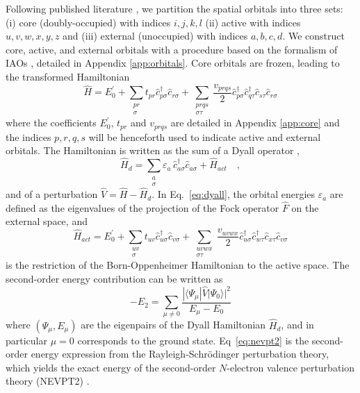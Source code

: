 \documentclass[aps,pra,twocolumn]{revtex4-2}
\newcommand{\crt}[1]{\hat{c}_{#1}^\dagger}
\newcommand{\dst}[1]{\hat{c}_{#1}^{\phantom{\dagger}}}
\begin{document}
Following published literature \cite{sokolov2016time,sokolov2017time}, we partition the spatial orbitals into three sets:
(i) core (doubly-occupied) with indices $i,j,k,l$ 
(ii) active with indices $u,v,w,x,y,z$ and 
(iii) external (unoccupied) with indices $a,b,c,d$. 
We construct core, active, and external orbitals with a procedure based on the formalism of IAOs \cite{knizia2013intrinsic}, detailed in Appendix \ref{app:orbitals}.
Core orbitals are frozen, leading to the transformed Hamiltonian
\begin{equation}
\label{eq:core_frozen}
\hat{H} = E_0^\prime + \sum_{\substack{pr \\ \sigma}} t_{pr} \crt{p\sigma} \dst{r\sigma} + \sum_{\substack{prqs \\ \sigma\tau}} \frac{v_{prqs}}{2} \crt{p\sigma} \crt{q\tau} \dst{s\tau}  \dst{r\sigma}
\end{equation}
where the coefficients $E_0^\prime$, $t_{pr}$ and $v_{prqs}$ are detailed in Appendix \ref{app:core} and the indices $p,r,q,s$ will be henceforth used to indicate
active and external orbitals. The Hamiltonian is written as the sum of a Dyall operator \cite{dyall1995choice},
\begin{equation}
\label{eq:dyall}
\hat{H}_d = \sum_{\substack{a \\ \sigma}} \varepsilon_a \, \crt{a\sigma} \dst{a\sigma} + \hat{H}_{act} \quad,
\end{equation}
and of a perturbation $\hat{V} = \hat{H} - \hat{H}_d$. 
In Eq.~\eqref{eq:dyall}, the orbital energies $\varepsilon_a$ are defined as the eigenvalues of the projection of the Fock operator $\hat{F}$ on the external space, and
\begin{equation}
\hat{H}_{act} = E_0^\prime + \sum_{\substack{uv \\ \sigma}} t_{uv} \crt{u\sigma} \dst{v\sigma} 
+ \sum_{\substack{uvwx \\\sigma\tau}} \frac{v_{uvwx}}{2} \crt{u\sigma} \crt{w\tau} \dst{x\tau}  \dst{v\sigma}
\end{equation}
is the restriction of the Born-Oppenheimer Hamiltonian to the active space.
The second-order energy contribution can be written as
\begin{equation}
\label{eq:nevpt2}
- E_2 = \sum_{\mu \neq 0} \frac{| \langle \Psi_\mu | \hat{V} | \Psi_0 \rangle |^2}{E_\mu - E_0}
\end{equation}
where $(\Psi_\mu,E_\mu)$ are the eigenpairs of the Dyall Hamiltonian $\hat{H}_d$, and in particular $\mu=0$ corresponds to the ground state. 
Eq~\eqref{eq:nevpt2} is the second-order energy expression from the Rayleigh-Schr\"{o}dinger perturbation theory,
which yields the exact energy of the second-order $N$-electron valence perturbation theory (NEVPT2) \cite{angeli2001introduction,angeli2001n,sokolov2016time,sokolov2017time}.
\end{document}
